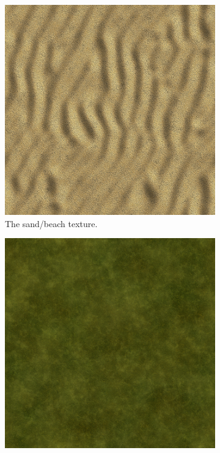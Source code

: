 \begin{figure}[H]
\begin{subfigure}{.32\textwidth}
  \centering
  \includegraphics[width=0.9\linewidth]{images/textureSand.jpg}
  \caption{The sand/beach texture.}
  \label{fig:textureSand}
\end{subfigure}%
\begin{subfigure}{.32\textwidth}
  \centering
  \includegraphics[width=0.9\linewidth]{images/textureGrass.jpg}

\end{subfigure}
\end{figure}
